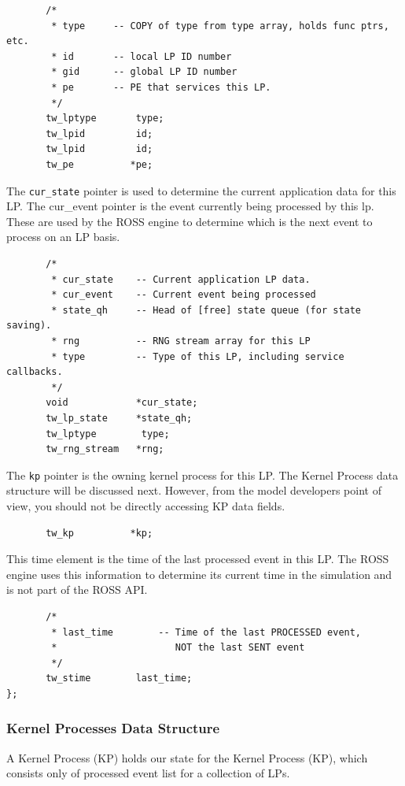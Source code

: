 \documentclass[12pt]{article}
\begin{document}
\begin{verbatim} 
       /*
        * type     -- COPY of type from type array, holds func ptrs, etc.
        * id       -- local LP ID number
        * gid      -- global LP ID number
        * pe       -- PE that services this LP.
        */
       tw_lptype       type;
       tw_lpid         id;
       tw_lpid         id;
       tw_pe          *pe;
\end{verbatim}
 
The {\tt cur\_state} pointer is used to determine the current application
data for this LP.  The cur\_event pointer is the event currently being
processed by this lp.  These are used by the ROSS engine to determine
which is the next event to process on an LP basis.

\begin{verbatim}
       /*
        * cur_state    -- Current application LP data.
        * cur_event    -- Current event being processed
        * state_qh     -- Head of [free] state queue (for state saving).
        * rng          -- RNG stream array for this LP
        * type         -- Type of this LP, including service callbacks.
        */
       void            *cur_state;
       tw_lp_state     *state_qh;
       tw_lptype        type;
       tw_rng_stream   *rng;
\end{verbatim}

The {\tt kp} pointer is the owning kernel process for this LP. The
Kernel Process data structure will be discussed next. However, from
the model developers point of view, you should not be directly
accessing KP data fields. 
 
\begin{verbatim}
       tw_kp          *kp;
\end{verbatim}

This time element is the time of the last processed event in this LP.
The ROSS engine uses this information to determine its current time
in the simulation and is not part of the ROSS API.

\begin{verbatim}
       /*
        * last_time        -- Time of the last PROCESSED event, 
        *                     NOT the last SENT event
        */
       tw_stime        last_time;
};
\end{verbatim}

\subsubsection{Kernel Processes Data Structure}
A Kernel Process (KP) holds our state for the Kernel Process (KP),
which consists only of processed event list for a collection of LPs.
\end{document}

